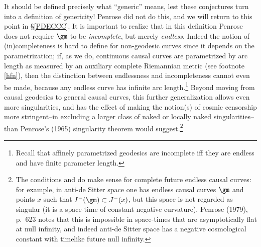 \documentclass[11pt,a4paper]{article}
\begin{document}
It should be defined precisely what ``generic''  means, lest these conjectures turn into a definition of genericity! Penrose did not do this, and we will return to this point in \S\ref{PDECCC}. It is important to realize that in this definition Penrose does not require $\gm$ to be \emph{incomplete}, but merely \emph{endless}. Indeed the notion of (in)completeness is hard to define for non-geodesic curves since it depends on the parametrization;  if, as we do, continuous causal curves are parametrized by arc length as measured by an auxiliary complete Riemannian metric (see footnote \ref{hfn}), then the distinction between endlessness and incompleteness cannot even be made, because any endless curve has infinite arc length.\footnote{Recall that affinely parametrized geodesics are incomplete iff they are endless and have finite parameter length.} Beyond moving from causal geodesics to general  causal curves, this further generalization allows even more singularities, and has the effect of making the notion(s) of cosmic censorship more stringent--in excluding a larger class of naked or locally naked singularities--than Penrose's (1965)  singularity theorem would suggest.\footnote{The conditions 
and  do make  sense for complete future endless causal curves: for example,  in anti-de Sitter space one has   endless causal curves $\gm$ and points $x$ such that $I^-(\gm)\subset J^-(x)$, but this space is not regarded as singular (it is a  space-time of constant negative curvature).  
Penrose (1979), p.\ 623 notes that this is impossible in space-times that are asymptotically flat at null infinity, and indeed
 anti-de Sitter space has a negative cosmological constant with timelike future null infinity. 
 }
\end{document}

